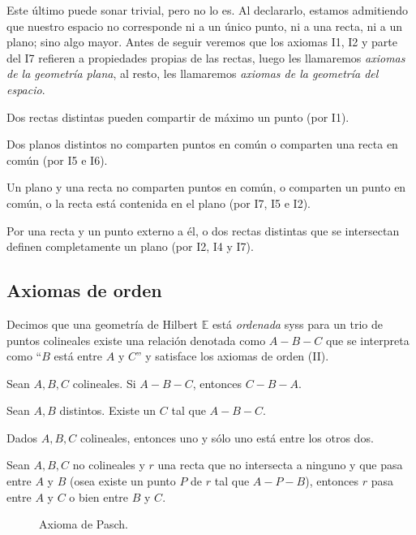 \documentclass[11pt,a4paper]{book}
\begin{document}
Este último puede sonar trivial, pero no lo es. Al declararlo, estamos admitiendo que nuestro espacio no corresponde ni a un único punto, ni a una recta, ni a un plano; sino algo mayor. Antes de seguir veremos que los axiomas I1, I2 y parte del I7 refieren a propiedades propias de las rectas, luego les llamaremos \textit{axiomas de la geometría plana}, al resto, les llamaremos \textit{axiomas de la geometría del espacio}.
\begin{thm}
Dos rectas distintas pueden compartir de máximo un punto (por I1).
\end{thm}
\begin{thm}
Dos planos distintos no comparten puntos en común o comparten una recta en común (por I5 e I6).
\end{thm}
\begin{thm}
Un plano y una recta no comparten puntos en común, o comparten un punto en común, o la recta está contenida en el plano (por I7, I5 e I2).
\end{thm}
\begin{thm}
Por una recta y un punto externo a él, o dos rectas distintas que se intersectan definen completamente un plano (por I2, I4 y I7).
\end{thm}

\subsection*{Axiomas de orden}
\begin{mydef}
Decimos que una geometría de Hilbert $\mathbb{E}$ está \textit{ordenada} syss para un trio de puntos colineales existe una relación denotada como $A-B-C$ que se interpreta como ``$B$ está entre $A$ y $C$'' y satisface los axiomas de orden (II).
\end{mydef}
\begin{axiom}[II, 1]
Sean $A,B,C$ colineales. Si $A-B-C$, entonces $C-B-A$.
\end{axiom}
\begin{axiom}[II, 2]
Sean $A,B$ distintos. Existe un $C$ tal que $A-B-C$.
\end{axiom}
\begin{axiom}[II, 3]
Dados $A,B,C$ colineales, entonces uno y sólo uno está entre los otros dos.
\end{axiom}
\begin{axiom}[II, 4 (de Pasch)]
Sean $A,B,C$ no colineales y $r$ una recta que no intersecta a ninguno y que pasa entre $A$ y $B$ (osea existe un punto $P$ de $r$ tal que $A-P-B$), entonces $r$ pasa entre $A$ y $C$ o bien entre $B$ y $C$.
\end{axiom}
\begin{figure}[!ht]
\centering
{}
\caption{Axioma de Pasch.}
\end{figure}
\end{document}
